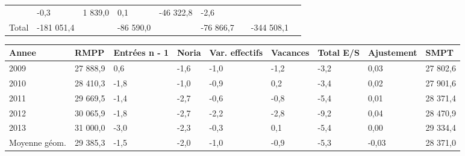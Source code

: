 \begin{longtable}[]{@{}lllllllll@{}}
\begin{minipage}[t]{0.16\columnwidth}
\end{minipage} & \begin{minipage}[t]{0.06\columnwidth}\raggedright
-0,3\strut
\end{minipage} & \begin{minipage}[t]{0.12\columnwidth}\raggedright
1 839,0\strut
\end{minipage} & \begin{minipage}[t]{0.06\columnwidth}\raggedright
0,1\strut
\end{minipage} & \begin{minipage}[t]{0.09\columnwidth}\raggedright
-46 322,8\strut
\end{minipage} & \begin{minipage}[t]{0.06\columnwidth}\raggedright
-2,6\strut
\end{minipage}\tabularnewline
\begin{minipage}[t]{0.05\columnwidth}\raggedright
Total\strut
\end{minipage} & \begin{minipage}[t]{0.10\columnwidth}\raggedright
-181 051,4\strut
\end{minipage} & \begin{minipage}[t]{0.06\columnwidth}\raggedright
\strut
\end{minipage} & \begin{minipage}[t]{0.16\columnwidth}\raggedright
-86 590,0\strut
\end{minipage} & \begin{minipage}[t]{0.06\columnwidth}\raggedright
\strut
\end{minipage} & \begin{minipage}[t]{0.12\columnwidth}\raggedright
-76 866,7\strut
\end{minipage} & \begin{minipage}[t]{0.06\columnwidth}\raggedright
\strut
\end{minipage} & \begin{minipage}[t]{0.09\columnwidth}\raggedright
-344 508,1\strut
\end{minipage} & \begin{minipage}[t]{0.06\columnwidth}\raggedright
\strut
\end{minipage}\tabularnewline
\bottomrule
\end{longtable}

\begin{longtable}[]{@{}lllllllll@{}}
\toprule
Annee & RMPP & Entrées n - 1 & Noria & Var. effectifs & Vacances & Total
E/S & Ajustement & SMPT\tabularnewline
\midrule
\endhead
2009 & 27 888,9 & 0,6 & -1,6 & -1,0 & -1,2 & -3,2 & 0,03 & 27
802,6\tabularnewline
2010 & 28 410,3 & -1,8 & -1,0 & -0,9 & 0,2 & -3,4 & 0,02 & 27
901,6\tabularnewline
2011 & 29 669,5 & -1,4 & -2,7 & -0,6 & -0,8 & -5,4 & 0,01 & 28
371,4\tabularnewline
2012 & 30 065,9 & -1,8 & -2,7 & -2,2 & -2,8 & -9,2 & 0,04 & 28
470,9\tabularnewline
2013 & 31 000,0 & -3,0 & -2,3 & -0,3 & 0,1 & -5,4 & 0,00 & 29
334,4\tabularnewline
Moyenne géom. & 29 385,3 & -1,5 & -2,0 & -1,0 & -0,9 & -5,3 & -0,03 & 28
371,0\tabularnewline
\bottomrule
\end{longtable}

